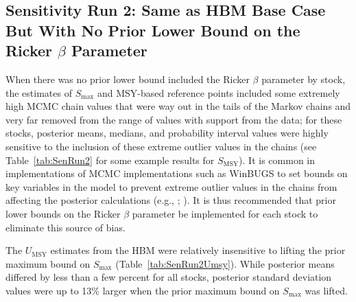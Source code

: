 \documentclass[french,11pt]{book}
\begin{document}
\endgroup{} \endgroup{}

\clearpage

\subsection{\texorpdfstring{Sensitivity Run 2: Same as HBM Base Case But With No Prior Lower Bound on the Ricker \(\beta\) Parameter}{Sensitivity Run 2: Same as HBM Base Case But With No Prior Lower Bound on the Ricker \textbackslash beta Parameter}}\label{sensitivity-run-2-same-as-hbm-base-case-but-with-no-prior-lower-bound-on-the-ricker-beta-parameter}

When there was no prior lower bound included the Ricker \(\beta\) parameter by stock, the estimates of \(S_\textrm{max}\) and MSY-based reference points included some extremely high MCMC chain values that were way out in the tails of the Markov chains and very far removed from the range of values with support from the data; for these stocks, posterior means, medians, and probability interval values were highly sensitive to the inclusion of these extreme outlier values in the chains (see Table~\ref{tab:SenRun2} for some example results for \(S_\textrm{MSY}\)). It is common in implementations of MCMC implementations such as WinBUGS to set bounds on key variables in the model to prevent extreme outlier values in the chains from affecting the posterior calculations (e.g., ; ). It is thus recommended that prior lower bounds on the Ricker \(\beta\) parameter be implemented for each stock to eliminate this source of bias.

The \(U_\textrm{MSY}\) estimates from the HBM were relatively insensitive to lifting the prior maximum bound on \(S_\textrm{max}\) (Table~\ref{tab:SenRun2Umsy}). While posterior means differed by less than a few percent for all stocks, posterior standard deviation values were up to 13\% larger when the prior maximum bound on $S_\textrm{max}$ was lifted.
\end{document}
